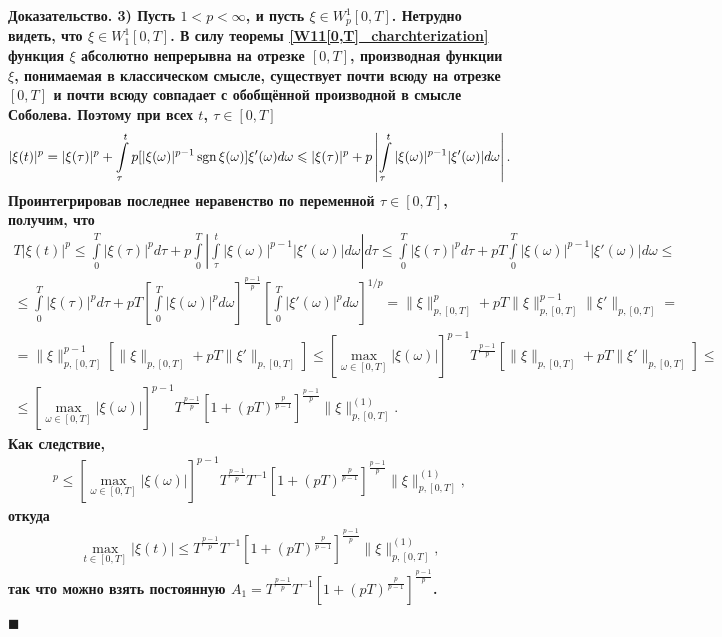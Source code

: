 \documentclass{report}
\newenvironment{Proof}{\par\noindent\bf Доказательство.\rm}{ $\blacksquare$\par}
\newcommand{\sgn}{\mathop{\rm sgn}}
\begin{document}
\begin{Proof}
3) Пусть $1<p<\infty$, и пусть $\xi\in W^1_p[0,T]$. Нетрудно видеть, что $\xi\in W^1_1[0,T]$. В силу теоремы \ref{W11[0,T]_charchterization} функция $\xi$  абсолютно непрерывна на отрезке
$[0,T]$, производная функции $\xi$, понимаемая в классическом смысле, существует почти всюду на отрезке $[0,T]$ и почти всюду совпадает с обобщённой производной в смысле Соболева. Поэтому
при всех $t$, $\tau\in[0,T]$
\begin{gather*}
|\xi(t)|^p=|\xi(\tau)|^p+\int\limits_\tau^tp[|\xi(\omega)|^{p-1}\sgn\xi(\omega)]\xi'(\omega)d\omega\leqslant
|\xi(\tau)|^p+p\left|\int\limits_\tau^t|\xi(\omega)|^{p-1}|\xi'(\omega)|d\omega\right|.
\end{gather*}
Проинтегрировав последнее неравенство по переменной $\tau\in[0,T]$, получим, что
\begin{gather*}
T|\xi(t)|^p\leqslant\int\limits_0^T|\xi(\tau)|^pd\tau+p\int\limits_0^T\left|\int\limits_\tau^t|\xi(\omega)|^{p-1}|\xi'(\omega)|d\omega\right|d\tau\leqslant
\int\limits_0^T|\xi(\tau)|^pd\tau+pT\int\limits_0^T|\xi(\omega)|^{p-1}|\xi'(\omega)|d\omega\leqslant\\
\leqslant\int\limits_0^T|\xi(\tau)|^pd\tau+pT\left[\int\limits_0^T|\xi(\omega)|^pd\omega\right]^{\frac{p-1}{p}}
\left[\int\limits_0^T|\xi'(\omega)|^pd\omega\right]^{1/p}=\|\xi\|^p_{p,[0,T]}+pT\|\xi\|^{p-1}_{p,[0,T]}\|\xi'\|_{p,[0,T]}=\\
=\|\xi\|^{p-1}_{p,[0,T]}[\|\xi\|_{p,[0,T]}+pT\|\xi'\|_{p,[0,T]}]\leqslant[\max\limits_{\omega\in[0,T]}|\xi(\omega)|]^{p-1}T^{\frac{p-1}p}
[\|\xi\|_{p,[0,T]}+pT\|\xi'\|_{p,[0,T]}]\leqslant\\
\leqslant[\max\limits_{\omega\in[0,T]}|\xi(\omega)|]^{p-1}T^{\frac{p-1}p}\left[1+(pT)^{\frac{p}{p-1}}\right]^{\frac{p-1}{p}}\|\xi\|^{(1)}_{p,[0,T]}.
\end{gather*}
Как следствие,
\begin{gather*}
[\max\limits_{t\in[0,T]}|\xi(t)|]^{p}\leqslant[\max\limits_{\omega\in[0,T]}|\xi(\omega)|]^{p-1}T^{\frac{p-1}p}T^{-1}
\left[1+(pT)^{\frac{p}{p-1}}\right]^{\frac{p-1}{p}}\|\xi\|^{(1)}_{p,[0,T]},
\end{gather*}
откуда
\begin{gather*}
\max\limits_{t\in[0,T]}|\xi(t)|\leqslant T^{\frac{p-1}p}T^{-1}\left[1+(pT)^{\frac{p}{p-1}}\right]^{\frac{p-1}{p}}\|\xi\|^{(1)}_{p,[0,T]},
\end{gather*}
так что можно взять постоянную $A_1=T^{\frac{p-1}p}T^{-1}\left[1+(pT)^{\frac{p}{p-1}}\right]^{\frac{p-1}{p}}$.


\end{Proof}
\end{document}
